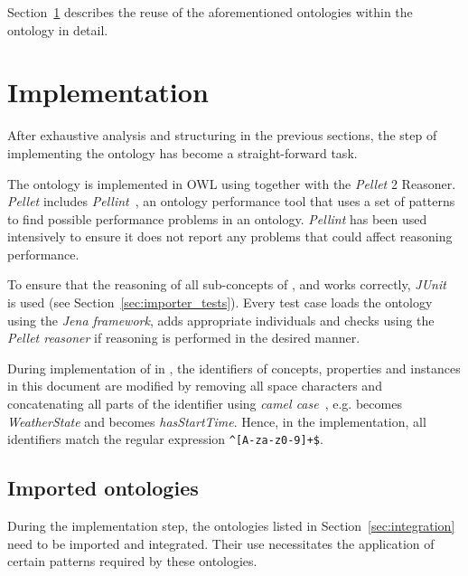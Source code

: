 Section~\ref{sec:implementation} describes the reuse of the aforementioned ontologies within the \smarthomeweather ontology in detail.

\section{Implementation}
\label{sec:implementation}


After exhaustive analysis and structuring in the previous sections, the step of implementing the ontology has become a straight-forward task.

The \smarthomeweather ontology is implemented in OWL using  together with the \emph{Pellet}  2 Reasoner. \emph{Pellet} includes \emph{Pellint}~\cite{pellint}, an ontology performance tool that uses a set of patterns to find possible performance problems in an  ontology. \emph{Pellint} has been used intensively to ensure it does not report any problems that could affect reasoning performance.

To ensure that the reasoning of all sub-concepts of ,  and  works correctly, \emph{JUnit}~\cite{junit} is used (see Section~\ref{sec:importer_tests}). Every test case loads the \smarthomeweather ontology using the \emph{Jena framework}, adds appropriate individuals and checks using the \emph{Pellet reasoner} if reasoning is performed in the desired manner.

During implementation of \smarthomeweather in , the identifiers of concepts, properties and instances in this document are modified by removing all space characters and concatenating all parts of the identifier using \emph{camel case}~\cite{CamelCase}, e.g.  becomes \emph{WeatherState} and  becomes \emph{hasStartTime}. Hence, in the  implementation, all identifiers match the regular expression \texttt{\textasciicircum[A-za-z0-9]+\$}.

\subsection{Imported ontologies}
\label{sec:ontology_imports}

During the implementation step, the ontologies listed in Section~\ref{sec:integration} need to be imported and integrated. Their use necessitates the application of certain patterns required by these ontologies.


